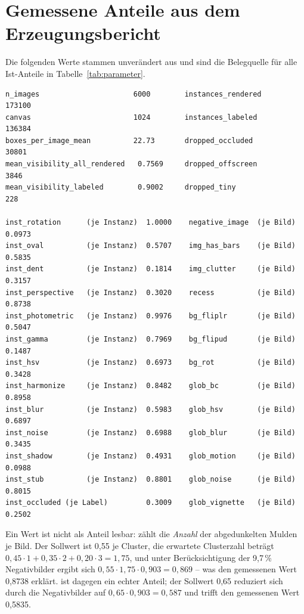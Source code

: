 \section{Gemessene Anteile aus dem Erzeugungsbericht}

Die folgenden Werte stammen unverändert aus
 und sind die Belegquelle für alle
Ist-Anteile in Tabelle~\ref{tab:parameter}.

\begin{footnotesize}
\begin{verbatim}
n_images                      6000        instances_rendered      173100
canvas                        1024        instances_labeled       136384
boxes_per_image_mean          22.73       dropped_occluded         30801
mean_visibility_all_rendered   0.7569     dropped_offscreen         3846
mean_visibility_labeled        0.9002     dropped_tiny               228

inst_rotation      (je Instanz)  1.0000    negative_image  (je Bild)  0.0973
inst_oval          (je Instanz)  0.5707    img_has_bars    (je Bild)  0.5835
inst_dent          (je Instanz)  0.1814    img_clutter     (je Bild)  0.3157
inst_perspective   (je Instanz)  0.3020    recess          (je Bild)  0.8738
inst_photometric   (je Instanz)  0.9976    bg_fliplr       (je Bild)  0.5047
inst_gamma         (je Instanz)  0.7969    bg_flipud       (je Bild)  0.1487
inst_hsv           (je Instanz)  0.6973    bg_rot          (je Bild)  0.3428
inst_harmonize     (je Instanz)  0.8482    glob_bc         (je Bild)  0.8958
inst_blur          (je Instanz)  0.5983    glob_hsv        (je Bild)  0.6897
inst_noise         (je Instanz)  0.6988    glob_blur       (je Bild)  0.3435
inst_shadow        (je Instanz)  0.4931    glob_motion     (je Bild)  0.0988
inst_stub          (je Instanz)  0.8801    glob_noise      (je Bild)  0.8015
inst_occluded (je Label)         0.3009    glob_vignette   (je Bild)  0.2502
\end{verbatim}
\end{footnotesize}

Ein Wert ist nicht als Anteil lesbar:  zählt die \emph{Anzahl} der
abgedunkelten Mulden je Bild. Der Sollwert ist 0,55 je Cluster, die erwartete
Clusterzahl beträgt
$0{,}45 \cdot 1 + 0{,}35 \cdot 2 + 0{,}20 \cdot 3 = 1{,}75$, und unter
Berücksichtigung der 9,7\,\% Negativbilder ergibt sich
$0{,}55 \cdot 1{,}75 \cdot 0{,}903 = 0{,}869$ -- was den gemessenen Wert 0,8738
erklärt.  ist dagegen ein echter Anteil; der Sollwert 0,65
reduziert sich durch die Negativbilder auf $0{,}65 \cdot 0{,}903 = 0{,}587$ und
trifft den gemessenen Wert 0,5835.

